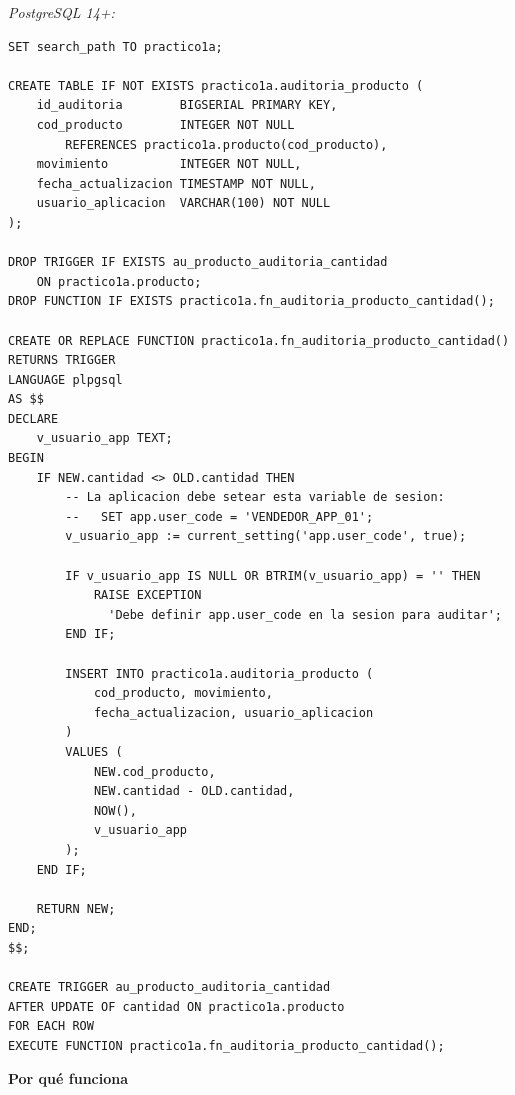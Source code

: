 \documentclass[11pt,a4paper]{article}
\newcommand{\itemcabecera}[1]{\noindent\textbf{#1}\par\medskip}
\newcommand{\bloquePorque}{\itemcabecera{Por qu\'e funciona}}
\begin{document}
\textit{PostgreSQL 14+:}

\begin{lstlisting}
SET search_path TO practico1a;

CREATE TABLE IF NOT EXISTS practico1a.auditoria_producto (
    id_auditoria        BIGSERIAL PRIMARY KEY,
    cod_producto        INTEGER NOT NULL
        REFERENCES practico1a.producto(cod_producto),
    movimiento          INTEGER NOT NULL,
    fecha_actualizacion TIMESTAMP NOT NULL,
    usuario_aplicacion  VARCHAR(100) NOT NULL
);

DROP TRIGGER IF EXISTS au_producto_auditoria_cantidad
    ON practico1a.producto;
DROP FUNCTION IF EXISTS practico1a.fn_auditoria_producto_cantidad();

CREATE OR REPLACE FUNCTION practico1a.fn_auditoria_producto_cantidad()
RETURNS TRIGGER
LANGUAGE plpgsql
AS $$
DECLARE
    v_usuario_app TEXT;
BEGIN
    IF NEW.cantidad <> OLD.cantidad THEN
        -- La aplicacion debe setear esta variable de sesion:
        --   SET app.user_code = 'VENDEDOR_APP_01';
        v_usuario_app := current_setting('app.user_code', true);

        IF v_usuario_app IS NULL OR BTRIM(v_usuario_app) = '' THEN
            RAISE EXCEPTION
              'Debe definir app.user_code en la sesion para auditar';
        END IF;

        INSERT INTO practico1a.auditoria_producto (
            cod_producto, movimiento,
            fecha_actualizacion, usuario_aplicacion
        )
        VALUES (
            NEW.cod_producto,
            NEW.cantidad - OLD.cantidad,
            NOW(),
            v_usuario_app
        );
    END IF;

    RETURN NEW;
END;
$$;

CREATE TRIGGER au_producto_auditoria_cantidad
AFTER UPDATE OF cantidad ON practico1a.producto
FOR EACH ROW
EXECUTE FUNCTION practico1a.fn_auditoria_producto_cantidad();
\end{lstlisting}

\bloquePorque
\end{document}
